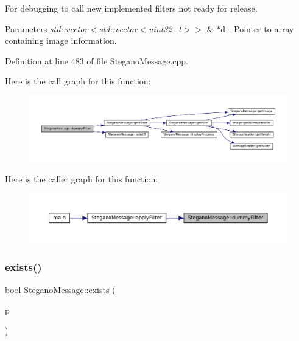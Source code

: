 For debugging to call new implemented filters not ready for release. 


\begin{DoxyParams}{Parameters}
{\em std\+::vector$<$std\+::vector$<$uint32\+\_\+t$>$$>$} & $\ast$d -\/ Pointer to array containing image information. \\
\hline
\end{DoxyParams}


Definition at line 483 of file Stegano\+Message.\+cpp.

Here is the call graph for this function\+:\nopagebreak
\begin{figure}[H]
\begin{center}
\leavevmode
\includegraphics[width=350pt]{classSteganoMessage_a1a26242c2e6d146cba1ad6831ab60ba7_cgraph}
\end{center}
\end{figure}
Here is the caller graph for this function\+:\nopagebreak
\begin{figure}[H]
\begin{center}
\leavevmode
\includegraphics[width=350pt]{classSteganoMessage_a1a26242c2e6d146cba1ad6831ab60ba7_icgraph}
\end{center}
\end{figure}
\mbox{\label{classSteganoMessage_acc5a49a35b46d8bf4c40cca8b8c5a52b}} 
\subsubsection{\texorpdfstring{exists()}{exists()}}
{\footnotesize\ttfamily bool Stegano\+Message\+::exists (\begin{DoxyParamCaption}\item[{std\+::string}]{p }\end{DoxyParamCaption})}



